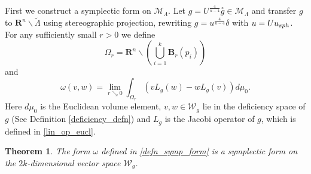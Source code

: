 \documentclass[reqno,11pt]{amsart}
\newtheorem{theorem}{Theorem}
\theoremstyle{tttheorem}
\newcommand{\R}{\mathbf{R}}
\newcommand{\B}{\mathbf{B}}
\begin{document}
First we construct a symplectic form on $\mathcal{M}_\Lambda$. Let 
$g = U^{\frac{4}{n-4}} \overset{\circ}{g} \in \mathcal{M}_\Lambda$ 
and transfer $g$ to $\R^n \backslash \widetilde \Lambda$ using stereographic projection, rewriting $g = u^{\frac{4}{n-4}} \delta$ with 
$u = U u_{\rm sph}$. For any sufficiently small $r>0$ we define
$$\Omega_r = \R^n \backslash \left ( \bigcup_{i=1}^k \B_r(p_i) \right )$$
and 
\begin{equation} \label{defn_symp_form}
\omega(v,w) = \lim_{r \searrow 0} \int_{\Omega_r} (v L_g (w) - 
w L_g (v) )d\mu_0.\end{equation} 
Here $d\mu_0$ is the Euclidean volume element, $v,w \in \mathcal{W}_g$ 
lie in the deficiency space of $g$ (See Definition \ref{deficiency_defn}) and $L_g$ is the Jacobi operator of $g$, 
which is defined in \eqref{lin_op_eucl}.

\begin{theorem} \label{thm:symp_form} 
The form $\omega$ defined in \eqref{defn_symp_form} is a 
symplectic form on the $2k$-dimensional vector space $\mathcal{W}_g$. 
\end{theorem}
\end{document}
